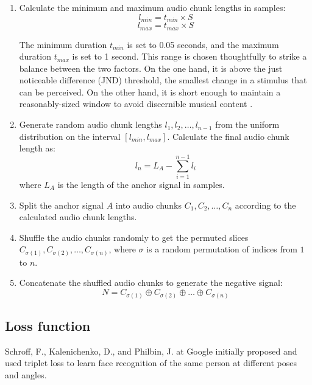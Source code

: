 \begin{enumerate}
\item Calculate the minimum and maximum audio chunk lengths in samples:
\begin{equation}
l_{min} = t_{min} \times S
\end{equation}
\begin{equation}
l_{max} = t_{max} \times S
\end{equation}

The minimum duration $t_{min}$ is set to 0.05 seconds, and the maximum duration $t_{max}$ is set to 1 second. This range is chosen thoughtfully to strike a balance between the two factors. On the one hand, it is above the just noticeable difference (JND) threshold, the smallest change in a stimulus that can be perceived. On the other hand, it is short enough to maintain a reasonably-sized window to avoid discernible musical content \cite{Fastl2007Just-NoticeableChanges}.

\item Generate random audio chunk lengths $l_1, l_2, \ldots, l_{n-1}$ from the uniform distribution on the interval $[l_{min}, l_{max}]$. Calculate the final audio chunk length as:
\begin{equation}
l_n = L_A - \sum_{i=1}^{n-1} l_i
\end{equation}
where $L_A$ is the length of the anchor signal in samples.
\item Split the anchor signal $A$ into audio chunks $C_1, C_2, \ldots, C_n$ according to the calculated audio chunk lengths.
\item Shuffle the audio chunks randomly to get the permuted slices $C_{\sigma(1)}, C_{\sigma(2)}, \ldots, C_{\sigma(n)}$, where $\sigma$ is a random permutation of indices from $1$ to $n$.
\item Concatenate the shuffled audio chunks to generate the negative signal:
\begin{equation}\label{eq:negative_signal}
N = C_{\sigma(1)} \oplus C_{\sigma(2)} \oplus \ldots \oplus C_{\sigma(n)}
\end{equation}
\end{enumerate}

\subsection{Loss function}

Schroff, F., Kalenichenko, D., and Philbin, J. at Google initially proposed and used triplet loss to learn face recognition of the same person at different poses and angles. \cite{Schroff2015FaceNet:Clustering}

